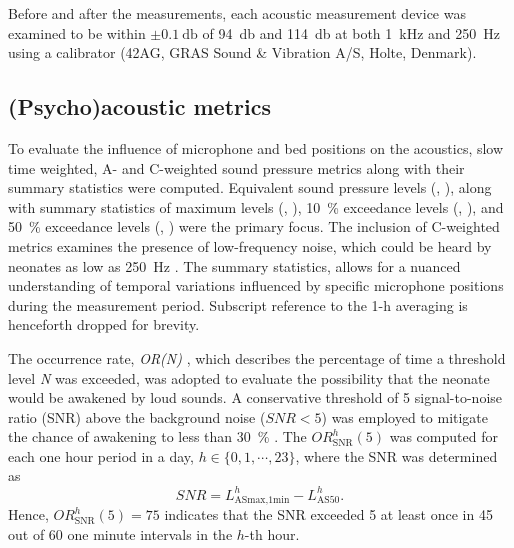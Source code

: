 Before and after the measurements, each acoustic measurement device was examined to be within $\pm\SI{0.1}{\decibel}$ of \SI{94}{\decibel} and \SI{114}{\decibel} at both \SI{1}{\kilo\hertz} and \SI{250}{\hertz} using a calibrator (42AG, GRAS Sound \& Vibration A/S, Holte, Denmark). 



\subsection{(Psycho)acoustic metrics}

To evaluate the influence of microphone and bed positions on the acoustics, slow time weighted, A- and C-weighted sound pressure metrics along with their summary statistics were computed. Equivalent sound pressure levels (, ), along with summary statistics of maximum levels (, ), \SI{10}{\percent} exceedance levels (, ), and \SI{50}{\percent} exceedance levels (, ) were the primary focus. The inclusion of C-weighted metrics examines the presence of low-frequency noise, which could be heard by neonates as low as \SI{250}{\hertz} \citep{novitski_neonatal_2007}. The summary statistics, allows for a nuanced understanding of temporal variations influenced by specific microphone positions during the measurement period. Subscript reference to the 1-\si{\hour} averaging is henceforth dropped for brevity. 

The occurrence rate, \textit{OR(N)} \citep{Bliefnick2019,Ryherd2008}, which describes the percentage of time a threshold level \textit{N} was exceeded, was adopted to evaluate the possibility that the neonate would be awakened by loud sounds. A conservative threshold of \SI{5}{\decibelA} signal-to-noise ratio (SNR) above the background noise ($\textit{SNR}<5$) was employed to mitigate the chance of awakening to less than \SI{30}{\percent} \citep{kuhn_evaluating_2011}. The $\textit{OR}_\text{SNR}^h(5)$ was computed for each one hour period in a day, $h\in\{0,1,\cdots,23\}$, where the SNR was determined as \citep{Smith2018}
\begin{equation}
    \textit{SNR} = \textit{L}_\text{ASmax,1min}^h - \textit{L}_\text{AS50}^h.
\end{equation} 
Hence, $\textit{OR}_\text{SNR}^h(5)=75$ indicates that the SNR exceeded \SI{5}{\decibelA} at least once in 45 out of 60 one minute intervals in the $h$-th hour.  


